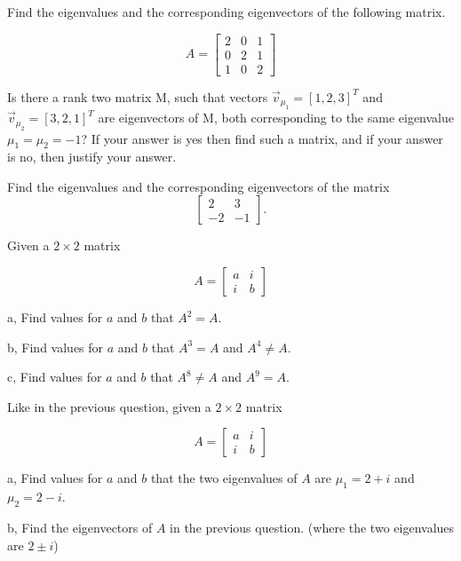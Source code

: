 \begin{problem}
\label{2009_a11_2}
Find the eigenvalues and the corresponding eigenvectors of
the following matrix.

$$
A=\left[\begin{array}{ccc}
  2 & 0 & 1\\
  0 & 2 & 1\\
  1 & 0 & 2
\end{array}\right]
$$
\end{problem}

\begin{problem}
\label{2009_a11_3}
Is there a rank two matrix M, such that vectors
$\overrightarrow{v}_{\mu_1}=[1,2,3]^T$ and
$\overrightarrow{v}_{\mu_2}=[3,2,1]^T$ are eigenvectors of M, both
corresponding to the same eigenvalue $\mu_1=\mu_2=-1$? If your
answer is yes then find such a matrix, and if your answer is no,
then justify your answer.

\end{problem}
\begin{problem}
\label{2009_a10_4b}
Find the eigenvalues and the corresponding eigenvectors of the matrix $$\left[\begin{array}{cc}2&3\\-2&-1\end{array}\right].$$
\end{problem}

\begin{problem}
\label{2009_a11_4}
Given a $2\times 2$ matrix

$$
A=\left[\begin{array}{cc}
  a & i \\
  i & b
\end{array}\right]
$$

a, Find values for $a$ and $b$ that $A^2=A$.

b, Find values for $a$ and $b$ that $A^3=A$ and $A^4\neq A$.

c, Find values for $a$ and $b$ that $A^8\neq A$ and $A^9 = A$.
\end{problem}

\begin{problem}
\label{2009_a11_5}
Like in the previous question, given a $2\times 2$ matrix

$$
A=\left[\begin{array}{cc}
  a & i \\
  i & b
\end{array}\right]
$$

a, Find values for $a$ and $b$ that the two eigenvalues of $A$ are
$\mu_1=2+i$ and $\mu_2=2-i$.

b, Find the eigenvectors of $A$ in the previous question. (where
the two eigenvalues are $2\pm i$)
\end{problem}



